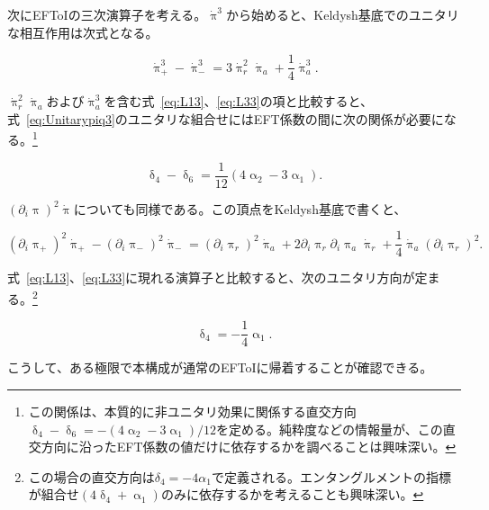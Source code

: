 \documentclass[a4paper,11pt]{ltjsarticle}
\numberwithin{equation}{section}
\def\uppia{\uppi_{a}}
\def\uppir{\uppi_{r}}
\newcommand{\Eq}[1]{Eq.~(\ref{#1})}
\newcommand{\Eqs}[1]{Eqs.~(\ref{#1})}
\renewcommand{\Eq}[1]{式~\eqref{#1}}
\renewcommand{\Eqs}[1]{式~\eqref{#1}}
\begin{document}
次にEFToIの三次演算子を考える。$\dot{\uppi}^3$から始めると、Keldysh基底でのユニタリな相互作用は次式となる。

\begin{equation}\label{eq:Unitarypiq3}
\dot{\uppi}^{3}_{+}-\dot{\uppi}^{3}_{-}=3\dot{\uppi}_{r}^{2}\dot{\uppi}_{a} + \frac{1}{4}\dot{\uppi}^{3}_{a}.
\end{equation}

$\dot{\uppi}_r^2\dot{\uppi}_a$および$\dot{\uppi}_a^3$を含む\Eqs{eq:L13}、\eqref{eq:L33}の項と比較すると、\Eq{eq:Unitarypiq3}のユニタリな組合せにはEFT係数の間に次の関係が必要になる。\footnote{この関係は、本質的に非ユニタリ効果に関係する直交方向$\updelta_4-\updelta_6=-(4\upalpha_2-3\upalpha_1)/12$を定める。純粋度などの情報量が、この直交方向に沿ったEFT係数の値だけに依存するかを調べることは興味深い。}

\begin{equation}\label{eq:combin1}
\updelta_4-\updelta_6= \frac{1}{12}\left(4 \upalpha_2 -3\upalpha_1 \right).
\end{equation}

$(\partial_i\uppi)^2\dot{\uppi}$についても同様である。この頂点をKeldysh基底で書くと、

\begin{equation}
(\partial_{i}\uppi_{+})^{2}\dot{\uppi}_{+}-(\partial_{i}\uppi_{-})^{2}\dot{\uppi}_{-}=(\partial_{i}\uppir)^{2}\dot{\uppi}_{a} + 2 \partial_{i}\uppir\partial_{i}\uppia\dot{\uppi}_r+\frac{1}{4}\dot{\uppi}_a(\partial_{i}\uppir)^{2}.
\end{equation}

\Eqs{eq:L13}、\eqref{eq:L33}に現れる演算子と比較すると、次のユニタリ方向が定まる。\footnote{この場合の直交方向は$\delta_4=-4\alpha_1$で定義される。エンタングルメントの指標が組合せ$(4\updelta_4+\upalpha_1)$のみに依存するかを考えることも興味深い。}

\begin{equation}\label{eq:combin2}
\updelta_{4}=-\frac{1}{4}\upalpha_1.
\end{equation}

こうして、ある極限で本構成が通常のEFToI\cite{Cheung:2007st}に帰着することが確認できる。
\end{document}
